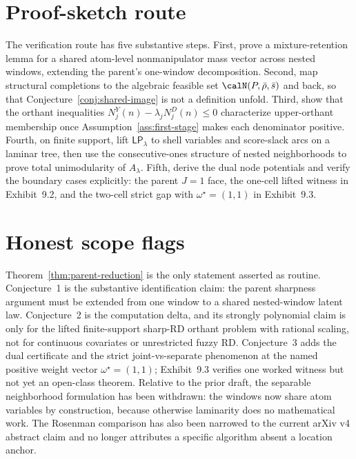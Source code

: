 \documentclass[11pt]{article}
\theoremstyle{definition}
\theoremstyle{plain}
\theoremstyle{remark}
\begin{document}
\section{Proof-sketch route}
The verification route has five substantive steps.  First, prove a mixture-retention lemma for a
shared atom-level nonmanipulator mass vector across nested windows, extending the parent's
one-window decomposition.  Second, map structural completions to the algebraic feasible set
\(\calN(P,\bar\rho,\bar s)\) and back, so that Conjecture~\ref{conj:shared-image} is not a
definition unfold.  Third, show that the orthant inequalities
\(N_j^Y(n)-\lambda_j N_j^D(n)\le 0\) characterize upper-orthant membership once
Assumption~\ref{ass:first-stage} makes each denominator positive.  Fourth, on finite support,
lift \(\mathsf{LP}_\lambda\) to shell variables and score-slack arcs on a laminar tree, then use
the consecutive-ones structure of nested neighborhoods to prove total unimodularity of
\(A_\lambda\).  Fifth, derive the dual node potentials and verify the boundary cases explicitly:
the parent \(J=1\) face, the one-cell lifted witness in Exhibit~9.2, and the two-cell strict gap
with \(\omega^\star=(1,1)\) in Exhibit~9.3.

\section{Honest scope flags}
Theorem~\ref{thm:parent-reduction} is the only statement asserted as routine.  Conjecture~1 is
the substantive identification claim: the parent sharpness argument must be extended from one
window to a shared nested-window latent law.  Conjecture~2 is the computation delta, and its
strongly polynomial claim is only for the lifted finite-support sharp-RD orthant problem with
rational scaling, not for continuous covariates or unrestricted fuzzy RD.  Conjecture~3 adds the
dual certificate and the strict joint-vs-separate phenomenon at the named positive weight vector
\(\omega^\star=(1,1)\); Exhibit~9.3 verifies one worked witness but not yet an open-class
theorem.  Relative to the prior draft, the separable neighborhood formulation has been
withdrawn: the windows now share atom variables by construction, because otherwise laminarity
does no mathematical work.  The Rosenman comparison has also been narrowed to the current arXiv
v4 abstract claim and no longer attributes a specific algorithm absent a location anchor.
\end{document}

